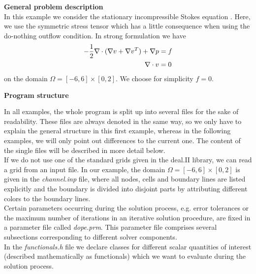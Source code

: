 \textbf{General problem description}\\

\vspace{0.2cm}
In this example we consider the stationary incompressible Stokes equation . Here,
we use the symmetric stress tensor which has a little consequence when using 
the do-nothing outflow condition. In strong formulation we have
\begin{align} \label{eq:strong}
-\frac{1}{2}\nabla\cdot (\nabla v + \nabla v^{T}) + \nabla p &= f \\ 
\nabla \cdot v &= 0 \notag
\end{align} 
on the domain $\Omega = [-6,6]\times [0,2]$. We choose for simplicity $f=0$.\\

\vspace{0.2cm}

\textbf{Program structure}\\

\vspace{0.2cm}

In all examples, the whole program is split up into several files for the sake of readability. These files are always denoted in the same way, so we only have to explain the general structure in this first example, whereas in the following examples, we will only point out differences to the current one. The content of the single files will be described in more detail below.\\

If we do not use one of the standard grids given in the deal.II library, we can read a grid from an input file. In our example, the domain $\Omega = [-6,6]\times [0,2]$ is given in the \textit{channel.inp} file, where all nodes, cells and boundary lines are listed explicitly and the boundary is divided into disjoint parts by attributing different colors to the boundary lines.\\

Certain parameters occurring during the solution process, e.g. error tolerances or the maximum number of iterations in an iterative solution procedure, are fixed in a parameter file called \textit{dope.prm}. This parameter file comprises several subsections corresponding to different solver components.\\

In the \textit{functionals.h} file we declare classes for different scalar quantities of interest (described mathematically as functionals) which we want to evaluate during the solution process.\\

